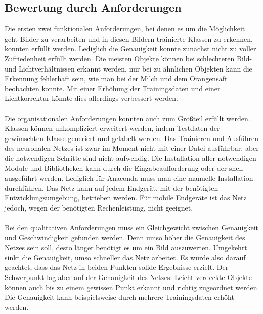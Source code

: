 \documentclass[a4paper,12pt,oneside]{article}
\begin{document}
\subsection{Bewertung durch Anforderungen}
Die ersten zwei funktionalen Anforderungen, bei denen es um die Möglichkeit geht Bilder zu verarbeiten und in diesen Bildern trainierte Klassen zu erkennen, konnten erfüllt werden. Lediglich die Genauigkeit konnte zunächst nicht zu voller Zufriedenheit erfüllt werden. Die meisten Objekte können bei schlechteren Bild- und Lichtverhältnissen erkannt werden, nur bei zu ähnlichen Objekten kann die Erkennung fehlerhaft sein, wie man bei der Milch und dem Orangensaft beobachten konnte. Mit einer Erhöhung der Trainingsdaten und einer Lichtkorrektur könnte dies allerdings verbessert werden.\\
\\
Die organisationalen Anforderungen konnten auch zum Großteil erfüllt werden. Klassen können unkompliziert erweitert werden, indem Testdaten der gewünschten Klasse generiert und gelabelt werden. Das Trainieren und Ausführen des neuronalen Netzes ist zwar im Moment nicht mit einer Datei ausführbar, aber die notwendigen Schritte sind nicht aufwendig. Die Installation aller notwendigen Module und Bibliotheken kann durch die Eingabeaufforderung oder der \glqq shell\grqq{} ausgeführt werden. Lediglich für Anaconda muss man eine manuelle Installation durchführen. Das Netz kann auf jedem Endgerät, mit der benötigten Entwicklungsumgebung, betrieben werden. Für mobile Endgeräte ist das Netz jedoch, wegen der benötigten Rechenleistung, nicht geeignet.\\
\\
Bei den qualitativen Anforderungen muss ein Gleichgewicht zwischen Genauigkeit und Geschwindigkeit gefunden werden. Denn umso höher die Genauigkeit des Netzes sein soll, desto länger benötigt es um ein Bild auszuwerten. Umgekehrt sinkt die Genauigkeit, umso schneller das Netz arbeitet. Es wurde also darauf geachtet, dass das Netz in beiden Punkten solide Ergebnisse erzielt. Der Schwerpunkt lag aber auf der Genauigkeit des Netzes. Leicht verdeckte Objekte können auch bis zu einem gewissen Punkt erkannt und richtig zugeordnet werden. Die Genauigkeit kann beispielsweise durch mehrere Trainingsdaten erhöht werden.\\
\end{document}
